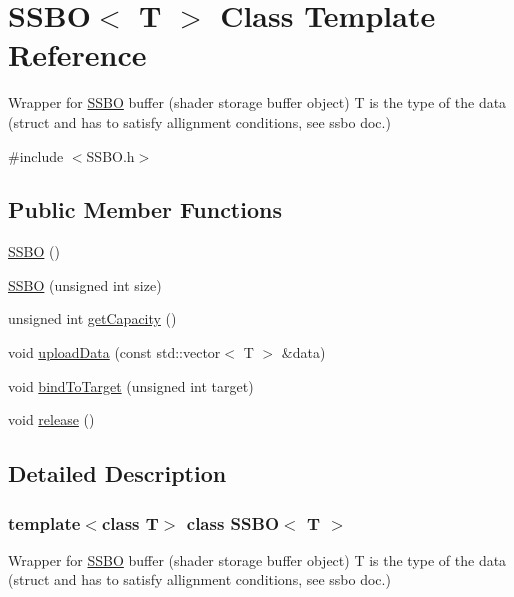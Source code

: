\hypertarget{class_s_s_b_o}{}\section{S\+S\+BO$<$ T $>$ Class Template Reference}
\label{class_s_s_b_o}


Wrapper for \mbox{\hyperlink{class_s_s_b_o}{S\+S\+BO}} buffer (shader storage buffer object) T is the type of the data (struct and has to satisfy allignment conditions, see ssbo doc.)  




{\ttfamily \#include $<$S\+S\+B\+O.\+h$>$}

\subsection*{Public Member Functions}
\begin{DoxyCompactItemize}
\item 
\mbox{\hyperlink{class_s_s_b_o_afb9a8159d1a56fbe8ab2e7fa732aa735}{S\+S\+BO}} ()
\item 
\mbox{\hyperlink{class_s_s_b_o_a16eace3a6222a1d7d52473177e0b021d}{S\+S\+BO}} (unsigned int size)
\item 
unsigned int \mbox{\hyperlink{class_s_s_b_o_aaf7637fa7d155a10f0ae3ffa0921e770}{get\+Capacity}} ()
\item 
void \mbox{\hyperlink{class_s_s_b_o_ac2321b5116f5765cff5c0c19a6f05ed4}{upload\+Data}} (const std\+::vector$<$ T $>$ \&data)
\item 
void \mbox{\hyperlink{class_s_s_b_o_a5cd3bcb7229aaadf919bedf0d9e0ae73}{bind\+To\+Target}} (unsigned int target)
\item 
void \mbox{\hyperlink{class_s_s_b_o_af82e409e9d2d40913bed3dfb903d1b14}{release}} ()
\end{DoxyCompactItemize}


\subsection{Detailed Description}
\subsubsection*{template$<$class T$>$\newline
class S\+S\+B\+O$<$ T $>$}

Wrapper for \mbox{\hyperlink{class_s_s_b_o}{S\+S\+BO}} buffer (shader storage buffer object) T is the type of the data (struct and has to satisfy allignment conditions, see ssbo doc.) 



